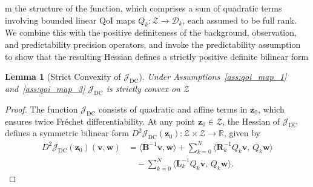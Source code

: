 \documentclass[final,1p,times]{elsarticle}
\newtheorem{lemma}{Lemma}[section]
\begin{document}
m the structure of the function, which comprises a sum of quadratic terms involving bounded linear QoI maps $ Q_k: \mathcal{Z} \rightarrow \mathcal{D}_k $, each assumed to be full rank. We combine this with the positive definiteness of the background, observation, and predictability precision operators, and invoke the predictability assumption to show that the resulting Hessian defines a strictly positive definite bilinear form

\begin{lemma}[Strict Convexity of $\mathcal{J}_{\mathrm{DC}}$]\label{lemma:convexity}
Under Assumptions~\ref{ass:qoi_map_1} and~\ref{ass:qoi_map_3} $\mathcal{J}_{\mathrm{DC}}$ is strictly convex on $\mathcal{Z}$
\end{lemma}
\begin{proof}
The function $ \mathcal{J}_{\mathrm{DC}} $ consists of quadratic and affine terms in $ \mathbf{z}_0 $, which ensures twice Fréchet differentiability. At any point $ \mathbf{z}_0 \in \mathcal{Z} $, the Hessian of $ \mathcal{J}_{\mathrm{DC}} $ defines a symmetric bilinear form $ D^2 \mathcal{J}_{\mathrm{DC}}(\mathbf{z}_0) : \mathcal{Z} \times \mathcal{Z} \to \mathbb{R} $, given by
\begin{equation}
\begin{split}
D^2 \mathcal{J}_{\mathrm{DC}}(\mathbf{z}_0)\!\left(\mathbf{v}, \mathbf{w}\right) 
    &= \langle \mathbf{B}^{-1} \mathbf{v}, \mathbf{w} \rangle + \sum_{k=0}^N \langle \mathbf{R}_k^{-1} Q_k \mathbf{v}, \, Q_k \mathbf{w} \rangle \\
    &\quad - \sum_{k=0}^N \langle \mathbf{L}_k^{-1} Q_k \mathbf{v}, \, Q_k \mathbf{w} \rangle.
\end{split}
\end{equation}


\end{proof}
\end{document}

